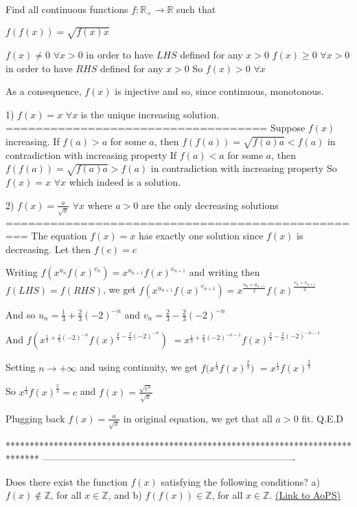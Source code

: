 \begin{solution}
	\begin{tcolorbox}Find all continuous functions $f: \mathbb{R_+}\to\mathbb{R}$ such that

$f(f(x))=\sqrt{f(x)x}$\end{tcolorbox}
$f(x)\ne 0$ $\forall x>0$ in order to have $LHS$ defined for any $x>0$
$f(x)\ge 0$ $\forall x>0$ in order to have $RHS$ defined for any $x>0$
So $f(x)>0$ $\forall x$

As a consequence, $f(x)$ is injective and so, since continuous, monotonous.

1) $f(x)=x$ $\forall x$ is the unique increasing solution.
===================================
Suppose $f(x)$ increasing.
If $f(a)>a$ for some $a$, then $f(f(a))=\sqrt{f(a)a}<f(a)$ in contradiction with increasing property
If $f(a)<a$ for some $a$, then $f(f(a))=\sqrt{f(a)a}>f(a)$ in contradiction with increasing property
So $f(x)=x$ $\forall x$ which indeed is a solution.

2) $f(x)=\frac a{\sqrt x}$ $\forall x$ where $a>0$ are the only decreasing solutions
=================================================
The equation $f(x)=x$ has exactly one solution since $f(x)$ is decreasing. 
Let then $f(c)=c$

Writing $f(x^{u_n}f(x)^{v_n})=x^{u_{n+1}}f(x)^{v_{n+1}}$ and writing then $f(LHS)=f(RHS)$, we get $f(x^{u_{n+1}}f(x)^{v_{n+1}})=x^{\frac{u_n+u_{n+1}}2}f(x)^{\frac{v_n+v_{n+1}}2}$

And so $u_n=\frac 13+\frac 23(-2)^{-n}$ and $v_n=\frac 23-\frac 23(-2)^{-n}$

And $f(x^{\frac 13+\frac 23(-2)^{-n}}f(x)^{\frac 23-\frac 23(-2)^{-n}})$ $=x^{\frac 13+\frac 23(-2)^{-n-1}}f(x)^{\frac 23-\frac 23(-2)^{-n-1}}$

Setting $n\to +\infty$ and using continuity, we get ${f(x^{\frac 13}}f(x)^{\frac 23})$ $=x^{\frac 13}f(x)^{\frac 23}$

So ${x^{\frac 13}}f(x)^{\frac 23}=c$ and $f(x)=\frac{\sqrt{c^3}}{\sqrt x}$

Plugging back $f(x)=\frac a{\sqrt x}$ in original equation, we get that all $a>0$ fit.
Q.E.D
\end{solution}
*******************************************************************************
-------------------------------------------------------------------------------

\begin{problem}
	Does there exist the function $f(x)$ satisfying the following conditions?
a) $f(x){\notin} \mathbb Z$, for all $x{\in} \mathbb Z$, and
b) $f(f(x)){\in} \mathbb Z$, for all $x{\in} \mathbb Z$.
	\flushright \href{https://artofproblemsolving.com/community/c6h446522}{(Link to AoPS)}
\end{problem}



